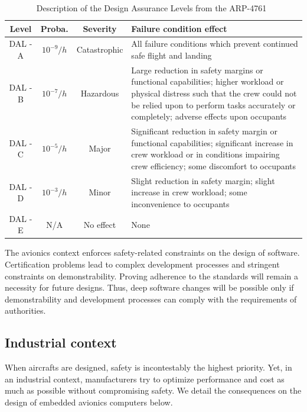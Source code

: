 \documentclass[main.tex]{subfiles}
\begin{document}
\begin{table}
    \centering  
    {
    \small
    \begin{tabularx}{\textwidth}{cccX}
	\hline
        {\sc \textbf{Level}} 	& {\sc \textbf{Proba.}} & {\sc \textbf{Severity}} & {\sc \textbf{Failure condition effect}}	\\
	    \hline
        DAL - A & $10^{-9}/h$ & Catastrophic & All failure conditions which prevent continued safe flight and landing \\
        
        \hline
        DAL - B & $10^{-7}/h$ & Hazardous    & Large reduction in safety margins or functional capabilities; higher workload or physical distress such that the crew could not be relied upon to perform tasks accurately or completely; adverse effects upon occupants\\

        \hline
        DAL - C & $10^{-5}/h$ & Major        & Significant reduction in safety margin or functional capabilities; significant increase in crew workload or in conditions impairing crew efficiency; some discomfort to occupants\\

        \hline
        DAL - D & $10^{-3}/h$ & Minor        & Slight reduction in safety margin; slight increase in crew workload; some inconvenience to occupants \\

        \hline
        DAL - E &   N/A       & No effect    & None \\
        \hline	
\end{tabularx}
    }
    \caption{Description of the Design Assurance Levels from the ARP-4761~\cite{arp4761}}
    \label{tab_intro_DALs}
\end{table}

The avionics context enforces safety-related constraints on the design of software. Certification problems lead to complex development processes and stringent constraints on demonstrability. Proving adherence to the standards will remain a necessity for future designs. Thus, deep software changes will be possible only if demonstrability and development processes can comply with the requirements of authorities.


\subsection{Industrial context}
When aircrafts are designed, safety is incontestably the highest priority. Yet, in an industrial context, manufacturers try to optimize performance and cost as much as possible without compromising safety. We detail the consequences on the design of embedded avionics computers below.
\end{document}
